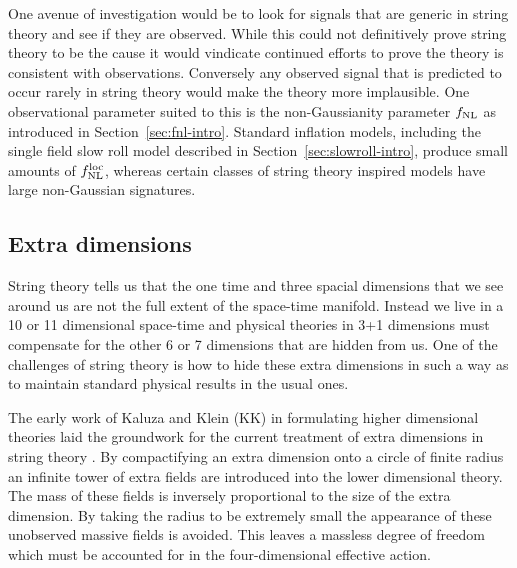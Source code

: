 One avenue of investigation would be to look for signals that are generic in string theory and
see if they are observed. While this could not definitively prove string theory to be the 
cause it would vindicate continued efforts to prove the theory is consistent
with observations. Conversely any observed
signal that is predicted to occur rarely in string theory would make the theory more implausible.
One observational parameter suited to this is the non-Gaussianity
parameter $f_{\mathrm{NL}}$ as introduced in Section~\ref{sec:fnl-intro}.
Standard inflation models, including the single field slow roll model described in
Section~\ref{sec:slowroll-intro}, produce small amounts of $f_{\mathrm{NL}}^\mathrm{loc}$, whereas
certain classes of string theory inspired models have large non-Gaussian
signatures. 

\subsection{Extra dimensions}
String theory tells us that the one time and three spacial dimensions that we
see
around us are not the full extent of the space-time manifold. Instead
we live in a 10 or
11 dimensional space-time and physical theories in 3+1 dimensions must
compensate for the
other 6 or 7 dimensions that are hidden from us. One of the challenges of string theory is how 
to hide these extra dimensions in such a way as to maintain standard physical
results in the usual
ones. 

The early work of Kaluza and Klein (KK) in formulating higher dimensional 
theories laid the groundwork for the current treatment of extra dimensions in
string theory \cite{Kaluza1921, Klein1926}. By
compactifying an extra dimension onto a circle of finite radius an infinite
tower of extra fields are introduced into the lower dimensional theory. The
mass of these fields is inversely proportional to the size of the extra
dimension. By taking the radius to be extremely small the appearance of these
unobserved massive fields is avoided. This leaves a
massless degree of freedom which must be accounted for in the four-dimensional
effective action. 



